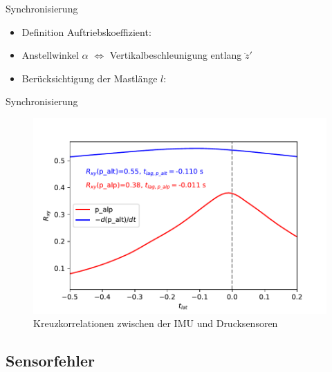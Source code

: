 \documentclass[ucs,9pt]{beamer}
\begin{document}
\begin{frame}{Synchronisierung}
	\begin{itemize}
		\item<1-> Definition Auftriebskoeffizient:
	\end{itemize}
	\begin{itemize}
		\item<2-> \alert<2>{Anstellwinkel $\alpha$ $\Longleftrightarrow$ Vertikalbeschleunigung entlang $\ddot{z}'$}
		\item<3-> Berücksichtigung der Mastlänge $l$:
	\end{itemize}
\end{frame}

\begin{frame}{Synchronisierung}
	\begin{figure}
	 	\includegraphics[width=.8\textwidth]{./docmedia/p_lag_fit.pdf}
	 	\caption{Kreuzkorrelationen zwischen der IMU und Drucksensoren}
	\end{figure}
\end{frame}

\subsection{Sensorfehler}
\end{document}
